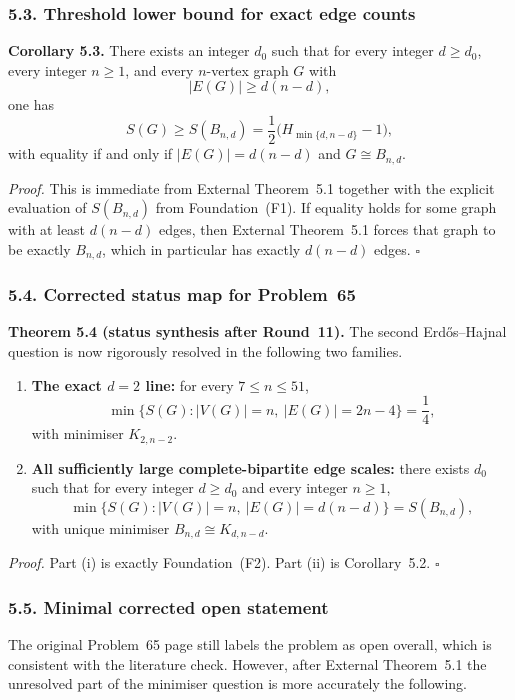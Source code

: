 \subsubsection*{5.3. Threshold lower bound for exact edge counts}

\textbf{Corollary 5.3.}
There exists an integer $d_0$ such that for every integer $d\ge d_0$, every integer $n\ge 1$, and every $n$-vertex graph $G$ with
\[
|E(G)|\ge d(n-d),
\]
one has
\[
S(G)\ge S(B_{n,d})=\frac12\bigl(H_{\min\{d,n-d\}}-1\bigr),
\]
with equality if and only if $|E(G)|=d(n-d)$ and $G\cong B_{n,d}$.

\medskip
\textit{Proof.}
This is immediate from External Theorem~5.1 together with the explicit evaluation of $S(B_{n,d})$ from Foundation~(F1).
If equality holds for some graph with at least $d(n-d)$ edges, then External Theorem~5.1 forces that graph to be exactly $B_{n,d}$, which in particular has exactly $d(n-d)$ edges.
\hfill$\square$

\subsubsection*{5.4. Corrected status map for Problem~65}

\textbf{Theorem 5.4 (status synthesis after Round~11).}
The second Erd\H{o}s--Hajnal question is now rigorously resolved in the following two families.

\begin{enumerate}
\item[(i)] \textbf{The exact $d=2$ line:} for every $7\le n\le 51$,
\[
\min\{S(G): |V(G)|=n,\ |E(G)|=2n-4\}=\frac14,
\]
with minimiser $K_{2,n-2}$.

\item[(ii)] \textbf{All sufficiently large complete-bipartite edge scales:} there exists $d_0$ such that for every integer $d\ge d_0$ and every integer $n\ge 1$,
\[
\min\{S(G): |V(G)|=n,\ |E(G)|=d(n-d)\}=S(B_{n,d}),
\]
with unique minimiser $B_{n,d}\cong K_{d,n-d}$.
\end{enumerate}

\medskip
\textit{Proof.}
Part (i) is exactly Foundation~(F2).
Part (ii) is Corollary~5.2.
\hfill$\square$

\subsubsection*{5.5. Minimal corrected open statement}

The original Problem~65 page still labels the problem as open overall, which is consistent with the literature check. However, after External Theorem~5.1 the unresolved part of the minimiser question is more accurately the following.

